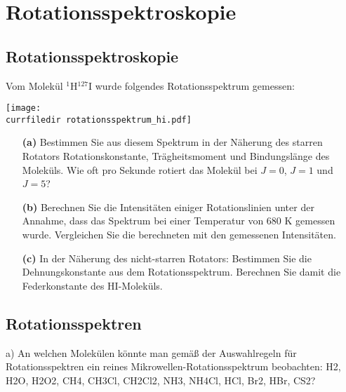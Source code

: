 \renewcommand{\lastmod}{\today}

\chapter{Rotationsspektroskopie}


\section{Rotationsspektroskopie}
\vspace{0.7cm}

Vom Molekül $^1$H$^{127}$I wurde folgendes Rotationsspektrum gemessen: \\
\vspace{3mm}


  \hspace*{5mm}
      \texttt{[image: \\currfiledir rotationsspektrum\_hi.pdf]}

\vspace*{1\baselineskip}

\begin{itemize}

	\item[\textbf{(a)}] Bestimmen Sie aus diesem Spektrum in der Näherung des starren Rotators Rotationskonstante, Trägheitsmoment und Bindungslänge des Moleküls. Wie oft pro Sekunde rotiert das Molekül bei $J=0$, $J=1$ und $J=5$?
											
	\item[\textbf{(b)}] Berechnen Sie die Intensitäten einiger Rotationslinien unter der Annahme, dass das Spektrum bei einer Temperatur von 680 K gemessen wurde. Vergleichen Sie die berechneten mit den gemessenen Intensitäten.
	
	\item[\textbf{(c)}] In der Näherung des nicht-starren Rotators: Bestimmen Sie die Dehnungskonstante aus dem Rotationsspektrum. Berechnen Sie damit die Federkonstante des HI-Moleküls.

\end{itemize}



\section{Rotationsspektren}

a) An welchen Molekülen könnte man gemäß der Auswahlregeln für Rotationsspektren ein reines Mikrowellen-Rotationsspektrum beobachten: H2, H2O, H2O2, CH4, CH3Cl, CH2Cl2, NH3, NH4Cl, HCl, Br2, HBr, CS2?

